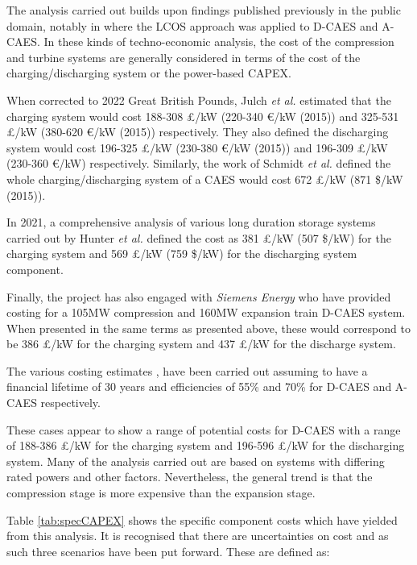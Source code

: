 \documentclass[preprint,12pt]{elsarticle}
\begin{document}
The analysis carried out builds upon findings published previously in the public domain, notably in \cite{Julch2015} where the LCOS approach was applied to D-CAES and A-CAES. In these kinds of techno-economic analysis, the cost of the compression and turbine systems are generally considered in terms of the cost of the charging/discharging system or the power-based CAPEX.

When corrected to 2022 Great British Pounds, Julch \textit{et al.} \cite{Julch2015} estimated that the charging system would cost 188-308 £/kW (220-340 €/kW (2015)) and 325-531 £/kW (380-620 €/kW (2015)) respectively. They also defined the discharging system would cost 196-325 £/kW (230-380 €/kW (2015)) and 196-309 £/kW (230-360 €/kW) respectively. Similarly, the work of Schmidt \textit{et al.} \cite{SCHMIDT201981} defined the whole charging/discharging system of a CAES would cost 672 £/kW (871 \$/kW (2015)).

In 2021, a comprehensive analysis of various long duration storage systems carried out by Hunter \textit{et al.} \cite{HUNTER20212077} defined the cost as 381 £/kW (507 \$/kW) for the charging system and 569 £/kW (759 \$/kW) for the discharging system component.

Finally, the project has also engaged with \textit{Siemens Energy} who have provided costing for a 105MW compression and 160MW expansion train D-CAES system. When presented in the same terms as presented above, these would correspond to be 386 £/kW for the charging system and 437 £/kW for the discharge system.  

The various costing estimates \cite{HUNTER20212077} \cite{Julch2015} \cite{SCHMIDT201981}, have been carried out assuming to have a financial lifetime of 30 years \cite{HUNTER20212077} and efficiencies of 55\% and 70\% for D-CAES and A-CAES respectively.

These cases appear to show a range of potential costs for D-CAES with a range of 188-386 £/kW for the charging system and 196-596 £/kW for the discharging system. Many of the analysis carried out are based on systems with differing rated powers and other factors. Nevertheless, the general trend is that the compression stage is more expensive than the expansion stage. 

Table \ref{tab:specCAPEX} shows the specific component costs which have yielded from this analysis. It is recognised that there are uncertainties on cost and as such three scenarios have been put forward. These are defined as:
\end{document}
